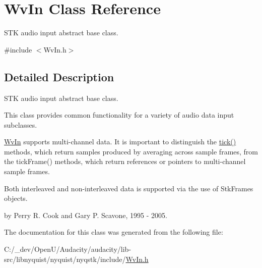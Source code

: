 \hypertarget{class_wv_in}{}\section{Wv\+In Class Reference}
\label{class_wv_in}


S\+TK audio input abstract base class.  




{\ttfamily \#include $<$Wv\+In.\+h$>$}



\subsection{Detailed Description}
S\+TK audio input abstract base class. 

This class provides common functionality for a variety of audio data input subclasses.

\hyperlink{class_wv_in}{Wv\+In} supports multi-\/channel data. It is important to distinguish the \hyperlink{instr_8cpp_a02d20b725355812062c8b0c91b172b61}{tick()} methods, which return samples produced by averaging across sample frames, from the tick\+Frame() methods, which return references or pointers to multi-\/channel sample frames.

Both interleaved and non-\/interleaved data is supported via the use of Stk\+Frames objects.

by Perry R. Cook and Gary P. Scavone, 1995 -\/ 2005. 

The documentation for this class was generated from the following file\+:\begin{DoxyCompactItemize}
\item 
C\+:/\+\_\+dev/\+Open\+U/\+Audacity/audacity/lib-\/src/libnyquist/nyquist/nyqstk/include/\hyperlink{_wv_in_8h}{Wv\+In.\+h}\end{DoxyCompactItemize}
